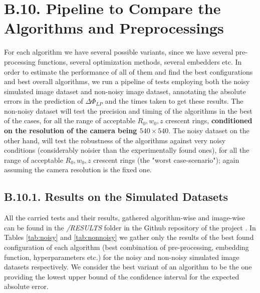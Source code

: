 \documentclass[11pt, a4paper, twoside]{article} %
\begin{document}
\section*{B.10. Pipeline to Compare the Algorithms and Preprocessings}
\vspace{-0.3cm}
For each algorithm we have several possible variants, since we have several pre-processing functions, several optimization methods, several embedders etc. In order to estimate the performance of all of them and find the best configurations and best overall algorithms, we run a pipeline of tests employing both the noisy simulated image dataset and non-noisy image dataset, annotating the absolute errors in the prediction of $\Delta\Phi_{LP}$ and the times taken to get these results. The non-noisy dataset will test the precision and timing of the algorithms in the best of the cases, for all the range of acceptable $R_0,w_0,z$ crescent rings, {\bf conditioned on the resolution of the camera being $540\times 540$}. The noisy dataset on the other hand, will test the robustness of the algorithms against very noisy conditions (considerably noisier than the experimentally found ones), for all the range of acceptable $R_0,w_0,z$ crescent rings (the "worst case-scenario"); again assuming the camera resolution is the fixed one. 
\vspace{-0.2cm}

\subsection*{B.10.1. Results on the Simulated Datasets}\vspace{-0.1cm}
All the carried tests and their results, gathered algorithm-wise and image-wise can be found in the {\em /RESULTS} folder in the Github repository of the project \cite{github}. In Tables \ref{tab:noisy} and \ref{tab:nonnoisy} we gather only the results of the best found configuration of each algorithm (best combination of pre-processing, embedding function, hyperparameters etc.) for the noisy and non-noisy simulated image datasets respectively. We consider the best variant of an algorithm to be the one providing the lowest upper bound of the confidence interval for the expected absolute error.\vspace{0.2cm} 
\end{document}
